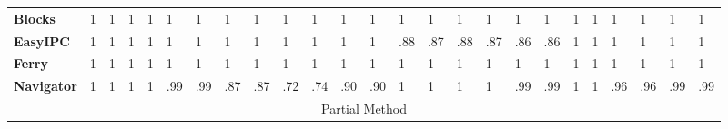 \documentclass[letterpaper]{article}
\theoremstyle{plain}
\begin{document}
\begin{table}[tb]
{\begin{tabular}{|l|llllll|llllll|llllll|llllll|}
\textbf{Blocks}              & 1                       & \multicolumn{1}{l|}{1}   & 1                       & \multicolumn{1}{l|}{1}   & 1                       & 1     & 1                       & \multicolumn{1}{l|}{1}   & 1                       & \multicolumn{1}{l|}{1}   & 1                       & 1   & 1                       & \multicolumn{1}{l|}{1}   & 1                       & \multicolumn{1}{l|}{1}   & 1                       & 1   & 1                       & \multicolumn{1}{l|}{1}    & 1                       & \multicolumn{1}{l|}{1}    & 1                       & 1    \\ \cline{1-1}
\textbf{EasyIPC}             & 1                       & \multicolumn{1}{l|}{1}   & 1                       & \multicolumn{1}{l|}{1}   & 1                       & 1     & 1                       & \multicolumn{1}{l|}{1}   & 1                       & \multicolumn{1}{l|}{1}   & 1                       & 1   & .88                     & \multicolumn{1}{l|}{.87} & .88                     & \multicolumn{1}{l|}{.87} & .86                     & .86 & 1                       & \multicolumn{1}{l|}{1}    & 1                       & \multicolumn{1}{l|}{1}    & 1                       & 1    \\ \cline{1-1}
\textbf{Ferry}               & 1                       & \multicolumn{1}{l|}{1}   & 1                       & \multicolumn{1}{l|}{1}   & 1                       & 1     & 1                       & \multicolumn{1}{l|}{1}   & 1                       & \multicolumn{1}{l|}{1}   & 1                       & 1   & 1                       & \multicolumn{1}{l|}{1}   & 1                       & \multicolumn{1}{l|}{1}   & 1                       & 1   & 1                       & \multicolumn{1}{l|}{1}    & 1                       & \multicolumn{1}{l|}{1}    & 1                       & 1    \\ \cline{1-1}
\textbf{Navigator}           & 1                       & \multicolumn{1}{l|}{1}   & 1                       & \multicolumn{1}{l|}{1}   & .99                     & .99   & .87                     & \multicolumn{1}{l|}{.87} & .72                     & \multicolumn{1}{l|}{.74} & .90                     & .90 & 1                       & \multicolumn{1}{l|}{1}   & 1                       & \multicolumn{1}{l|}{1}   & .99                     & .99 & 1                       & \multicolumn{1}{l|}{1}    & .96                     & \multicolumn{1}{l|}{.96}  & .99                     & .99  \\ \hline
\multicolumn{25}{|c|}{Partial Method}                                                                                                                                                                                                                                                                                                                                                                                                                                                                                                                                                                                      \\ \hline

\end{tabular}}
\end{table}
\end{document}
